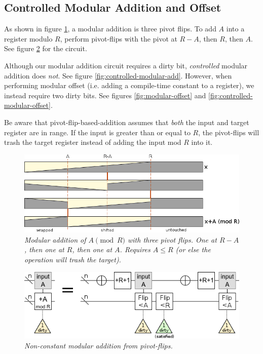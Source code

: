 \documentclass[twocolumn]{article}
\begin{document}
\subsection{Controlled Modular Addition and Offset}

As shown in figure \ref{fig:mod-add-from-pivot-flip-bars}, a modular addition is three pivot flips.
To add $A$ into a register modulo $R$, perform pivot-flips with the pivot at $R-A$, then $R$, then $A$.
See figure \ref{fig:modular-add} for the circuit.

Although our modular addition circuit requires a dirty bit, {\em controlled} modular addition does {\em not}.
See figure \ref{fig:controlled-modular-add}.
However, when performing modular offset (i.e. adding a compile-time constant to a register), we instead require two dirty bits.
See figures \ref{fig:modular-offset} and \ref{fig:controlled-modular-offset}.

Be aware that pivot-flip-based-addition assumes that {\em both} the input and target register are in range.
If the input is greater than or equal to $R$, the pivot-flips will trash the target register instead of adding the input mod $R$ into it.

\begin{figure}
  \centering
  \includegraphics[width=\linewidth]{assets/mod-add-from-pivot-flip-bars.png}
  \caption{\em
     Modular addition of $A \pmod{R}$ with three pivot flips.
     One at $R-A$, then one at $R$, then one at $A$.
     Requires $A \leq R$ (or else the operation will trash the target).
   }
  \label{fig:mod-add-from-pivot-flip-bars}
\end{figure}

\begin{figure}
  \centering
  \includegraphics[width=\linewidth]{assets/modular-addition.png}
  \caption{\em Non-constant modular addition from pivot-flips.}
  \label{fig:modular-add}
\end{figure}
\end{document}
